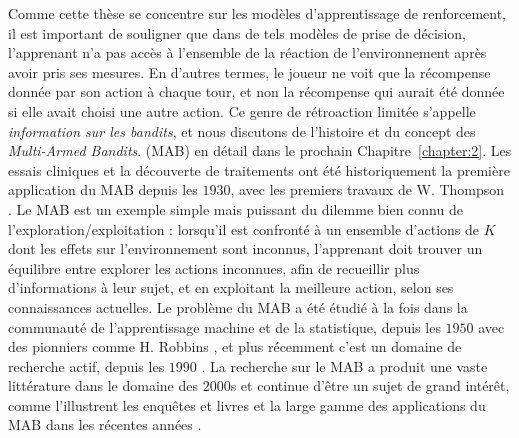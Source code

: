 \begin{resume_fr}
Comme cette thèse se concentre sur les modèles d'apprentissage de renforcement,
il est important de souligner que dans de tels modèles de prise de décision, l'apprenant n'a pas accès à l'ensemble de la réaction de l'environnement après avoir pris ses mesures.
%
En d'autres termes, le joueur ne voit que la récompense donnée par son action à chaque tour, et non la récompense qui aurait été donnée si elle avait choisi une autre action.
Ce genre de rétroaction limitée s'appelle \emph{information sur les bandits}, et nous discutons de l'histoire et du concept des \emph{Multi-Armed Bandits}. (MAB) en détail dans le prochain Chapitre~\ref{chapter:2}.
Les essais cliniques et la découverte de traitements ont été historiquement la première application du MAB depuis les $1930$, avec les premiers travaux de W. Thompson \cite{Thompson33}.
%
Le MAB est un exemple simple mais puissant du dilemme bien connu de l'exploration/exploitation :
lorsqu'il est confronté à un ensemble d'actions de $K$ dont les effets sur l'environnement sont inconnus, l'apprenant doit trouver un équilibre entre
explorer les actions inconnues, afin de recueillir plus d'informations à leur sujet,
et en exploitant la meilleure action, selon ses connaissances actuelles.
%
Le problème du MAB a été étudié à la fois dans la communauté de l'apprentissage machine et de la statistique, depuis les $1950$ avec des pionniers comme H. Robbins \cite{Robbins52}, et plus récemment c'est un domaine de recherche actif, depuis les $1990$ \cite{Anantharam87a,Anantharam87b,auer1995gambling,Agrawal95}.
La recherche sur le MAB a produit une vaste littérature dans le domaine des $2000$s \cite{Auer02,Auer02NonStochastic,Audibert2009minimax} et continue d'être un sujet de grand intérêt, comme l'illustrent les enquêtes et livres \cite{Bubeck12,LattimoreBanditAlgorithmsBook,Slivkins2019} et la large gamme des applications du MAB dans les récentes années \cite{bouneffouf2019survey}.


\end{resume_fr}
